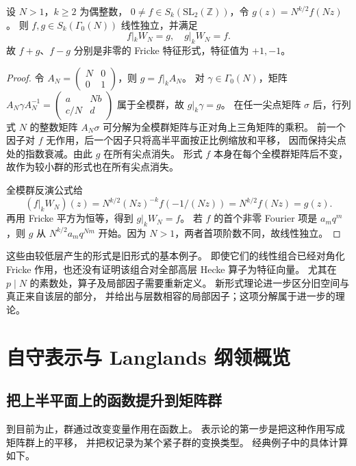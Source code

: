 \begin{proposition}[升层与交换的一对形式]\label{b3:prop:E-oldforms}
设 \(N>1\)，\(k\ge2\) 为偶整数，
\(0\ne f\in S_k(\mathrm{SL}_2(\mathbb Z))\)，令
\(g(z)=N^{k/2}f(Nz)\)。
则 \(f,g\in S_k(\Gamma_0(N))\) 线性独立，并满足
\[
 f|_kW_N=g,\quad g|_kW_N=f.
\]
故 \(f+g\)、\(f-g\) 分别是非零的 Fricke 特征形式，特征值为 \(+1,-1\)。
\end{proposition}
\begin{proof}
令 \(A_N=\left(\begin{smallmatrix}N&0\\0&1\end{smallmatrix}\right)\)，则 \(g=f|_kA_N\)。
对 \(\gamma\in\Gamma_0(N)\)，矩阵
\(A_N\gamma A_N^{-1}=\left(\begin{smallmatrix}a&Nb\\c/N&d\end{smallmatrix}\right)\)
属于全模群，故 \(g|_k\gamma=g\)。
在任一尖点矩阵 \(\sigma\) 后，行列式 \(N\) 的整数矩阵
\(A_N\sigma\) 可分解为全模群矩阵与正对角上三角矩阵的乘积。
前一个因子对 \(f\) 无作用，后一个因子只将高半平面按正比例缩放和平移，
因而保持尖点处的指数衰减。由此 \(g\) 在所有尖点消失。
形式 \(f\) 本身在每个全模群矩阵后不变，故作为较小群的形式也在所有尖点消失。

全模群反演公式给
\[
 (f|_kW_N)(z)=N^{k/2}(Nz)^{-k}f(-1/(Nz))
            =N^{k/2}f(Nz)=g(z).
\]
再用 Fricke 平方为恒等，得到 \(g|_kW_N=f\)。
若 \(f\) 的首个非零 Fourier 项是 \(a_mq^m\)，则 \(g\) 从
\(N^{k/2}a_mq^{Nm}\) 开始。因为 \(N>1\)，两者首项阶数不同，故线性独立。
\end{proof}
这些由较低层产生的形式是旧形式的基本例子。
即使它们的线性组合已经对角化 Fricke 作用，也还没有证明该组合对全部高层 Hecke 算子为特征向量。
尤其在 \(p\mid N\) 的素数处，算子及局部因子需要重新定义。
新形式理论进一步区分旧空间与真正来自该层的部分，
并给出与层数相容的局部因子；这项分解属于进一步的理论。

\section{自守表示与 Langlands 纲领概览}
\label{b3:sec:E05}

\subsection{把上半平面上的函数提升到矩阵群}
\label{b3:subsec:E0501}

到目前为止，群通过改变变量作用在函数上。
表示论的第一步是把这种作用写成矩阵群上的平移，
并把权记录为某个紧子群的变换类型。
经典例子中的具体计算如下。

